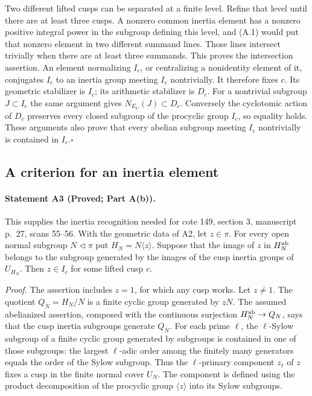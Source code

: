 Two different lifted cusps can be separated at a finite level. Refine that level until there are at least three cusps. A nonzero common inertia element has a nonzero positive integral power in the subgroup defining this level, and (A.1) would put that nonzero element in two different summand lines. Those lines intersect trivially when there are at least three summands. This proves the intersection assertion. An element normalizing $I_c$, or centralizing a nonidentity element of it, conjugates $I_c$ to an inertia group meeting $I_c$ nontrivially. It therefore fixes $c$. Its geometric stabilizer is $I_c$; its arithmetic stabilizer is $D_c$. For a nontrivial subgroup $J\subset I_c$ the same argument gives $N_{E_U}(J)\subset D_c$. Conversely the cyclotomic action of $D_c$ preserves every closed subgroup of the procyclic group $I_c$, so equality holds. These arguments also prove that every abelian subgroup meeting $I_c$ nontrivially is contained in $I_c$.\hfill$\square$

\subsection{A criterion for an inertia element}
\paragraph{Statement A3 (Proved; Part A(b)).}\label{res:A3}
This supplies the inertia recognition needed for cote 149, section 3, manuscript p.~27, scans 55--56.
With the geometric data of A2, let $z\in\pi$. For every open normal subgroup $N\triangleleft\pi$ put $H_N=N\langle z\rangle$. Suppose that the image of $z$ in $H_N^{\rm ab}$ belongs to the subgroup generated by the images of the cusp inertia groups of $U_{H_N}$. Then $z\in I_c$ for some lifted cusp $c$.

\emph{Proof.} The assertion includes $z=1$, for which any cusp works. Let $z\ne1$. The quotient $Q_N=H_N/N$ is a finite cyclic group generated by $zN$. The assumed abelianized assertion, composed with the continuous surjection $H_N^{\rm ab}\to Q_N$, says that the cusp inertia subgroups generate $Q_N$. For each prime $\ell$, the $\ell$-Sylow subgroup of a finite cyclic group generated by subgroups is contained in one of those subgroups: the largest $\ell$-adic order among the finitely many generators equals the order of the Sylow subgroup. Thus the $\ell$-primary component $z_\ell$ of $z$ fixes a cusp in the finite normal cover $U_N$. The component is defined using the product decomposition of the procyclic group $\langle z\rangle$ into its Sylow subgroups.

